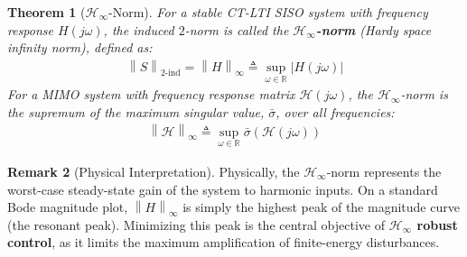 \documentclass[11pt, a4paper, twoside]{article}
\newcommand{\norm}[1]{\left\lVert#1\right\rVert}
\newcommand{\abs}[1]{\left\lvert#1\right\rvert}
\newcounter{lecnum}
\theoremstyle{plain}
\newtheorem{theorem}{Theorem}[lecnum]
\theoremstyle{definition}
\newtheorem{remark}[theorem]{Remark}
\begin{document}
\begin{theorem}[$\mathcal{H}_\infty$-Norm]
For a stable CT-LTI SISO system with frequency response $H(j\omega)$, the induced $2$-norm is called the \textbf{$\mathcal{H}_\infty$-norm} (Hardy space infinity norm), defined as:
%
\begin{align*}
    \norm{S}_{2\text{-ind}} = \norm{H}_{\infty} \triangleq \sup_{\omega \in \mathbb{R}} \abs{H(j\omega)}
\end{align*}
%
For a MIMO system with frequency response matrix $\mathcal{H}(j\omega)$, the $\mathcal{H}_\infty$-norm is the supremum of the maximum singular value, $\bar{\sigma}$, over all frequencies:
%
\begin{align*}
    \norm{\mathcal{H}}_{\infty} \triangleq \sup_{\omega \in \mathbb{R}} \bar{\sigma}(\mathcal{H}(j\omega))
\end{align*}
\end{theorem}

\begin{remark}[Physical Interpretation]
Physically, the $\mathcal{H}_\infty$-norm represents the worst-case steady-state gain of the system to harmonic inputs. On a standard Bode magnitude plot, $\norm{H}_{\infty}$ is simply the highest peak of the magnitude curve (the resonant peak). Minimizing this peak is the central objective of \textbf{$\mathcal{H}_\infty$ robust control}, as it limits the maximum amplification of finite-energy disturbances.
\end{remark}
\end{document}
